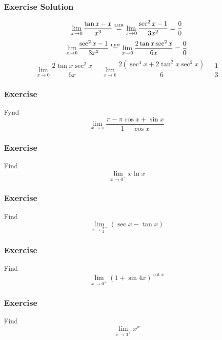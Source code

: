 \documentclass[xcolor=dvipsnames]{beamer}
\begin{document}
\begin{frame}
  \frametitle{Exercise Solution}
  \begin{equation}
    \label{eq:puyiepie}
    \lim_{x\rightarrow{}0}\frac{\tan{}x-x}{x^{3}}\stackrel{\mbox{\tiny LHR}}{=}\lim_{x\rightarrow{}0}\frac{\sec^{2}x-1}{3x^{2}}=\frac{0}{0}
  \end{equation}
  \begin{equation}
    \label{eq:aedeinah}
    \lim_{x\rightarrow{}0}\frac{\sec^{2}x-1}{3x^{2}}\stackrel{\mbox{\tiny LHR}}{=}\lim_{x\rightarrow{}0}\frac{2\tan{}x\sec^{2}x}{6x}=\frac{0}{0}
  \end{equation}
  \begin{equation}
    \label{eq:teipaeka}
    \lim_{x\rightarrow{}0}\frac{2\tan{}x\sec^{2}x}{6x}=\lim_{x\rightarrow{}0}\frac{2(\sec^{4}x+2\tan^{2}x\sec^{2}x)}{6}=\frac{1}{3}
  \end{equation}
\end{frame}

\begin{frame}
  \frametitle{Exercise}
  {\ubung} Fynd
  \begin{equation}
    \label{eq:eekuyuoc}
    \lim_{x\rightarrow\pi}\frac{\pi-\pi\cos{}x+\sin{}x}{1-\cos{}x}
  \end{equation}
\end{frame}

\begin{frame}
  \frametitle{Exercise}
  {\ubung} Find
  \begin{equation}
    \label{eq:zeisahda}
    \lim_{x\rightarrow{}0^{+}}x\ln{}x
  \end{equation}
\end{frame}

\begin{frame}
  \frametitle{Exercise}
  {\ubung} Find
  \begin{equation}
    \label{eq:ahgohgah}
    \lim_{x\rightarrow\frac{\pi}{2}^{-}}(\sec{}x-\tan{}x)
  \end{equation}
\end{frame}

\begin{frame}
  \frametitle{Exercise}
  {\ubung} Find
  \begin{equation}
    \label{eq:xughieta}
    \lim_{x\rightarrow{}0^{+}}(1+\sin{}4x)^{\cot{}x}
  \end{equation}
\end{frame}

\begin{frame}
  \frametitle{Exercise}
  {\ubung} Find
  \begin{equation}
    \label{eq:mahpeilu}
    \lim_{x\rightarrow{}0^{+}}x^{x}
  \end{equation}
\end{frame}
\end{document}
